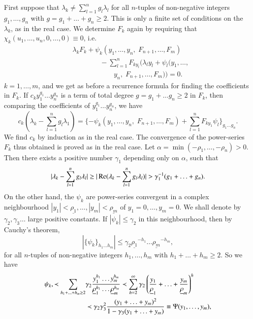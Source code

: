 First suppose that $\lambda_k \neq \sum\limits^n_{l=1} g_l\lambda_l$
for all $n$-tuples of non-negative integers $g_1, \ldots, g_n$ with $g
=g_1 + \ldots + g_n \geq 2$. This is only a finite set of conditions
on the $\lambda_k$, as in the real case. We determine $F_k$ again by
requiring that $\chi_k(u_1, \ldots, u_n, 0, \ldots, 0) \equiv 0$,
i.e. 
\begin{align*}
&\lambda_k F_k + \psi_k (y_1, \ldots, y_n, \; F_{n+1}, \ldots, F_m)\\ 
&\qquad\qquad -\sum\limits^n_{l=1} F_{ky_l} (\lambda_l y_l + \psi_l (y_1, \ldots,\\
&\qquad\qquad\qquad y_n, \; F_{n+1}, \ldots, F_m)) =0 . 
\tag*{$(\ast\ast)$}
\end{align*}
$k=1, \ldots, m$, and we get as before a recurrence formula for
finding the coefficients in $F_k$. If $c_k y^{g_1}_1 \ldots
y^{g_n}_n$ is a term of total degree $g = g_1 + \ldots g_n \geq 2 $ in
$F_k$, then comparing the coefficients of $y^{g_1}_1 \ldots
y^{g_n}_n$, we have  
$$
c_k \left(\lambda_k - \sum\limits^n_{l=1} g_l \lambda_1 \right) =
\{-\psi_k(y_1, \ldots, y_n,\; F_{n+1}, \ldots, F_m)  +
\sum\limits^n_{l=1} F_{ky_1} \psi_l\} _{g_1 \ldots g_n}.  
$$\pageoriginale
We find $c_k$ by induction as in the real case. The convergence of the
power-series $F_k$ thus obtained is proved as in the real case. Let
$\alpha = \min (-\rho_1, \ldots, -\rho_n) > 0$. Then there exists a
positive number $\gamma_1$ depending only on $\alpha$, such that  
$$
|\lambda_k - \sum\limits^n_{l=1} g_l \lambda_l| \geq |\operatorname{Re} (\lambda_k -
\sum\limits^n_{l=1} g_l \lambda_l) | > \gamma^{-1}_1 (g_1 + \ldots +
g_n).  
$$
On the other hand, the $\psi_k$ are power-series convergent in a
complex neighbourhood $|y_1| < \underline{\rho_1}, \ldots, |y_m|
<\underline{\rho_m}$ of $y_1 = 0, \ldots, y_m = 0$. We shall denote by
$\gamma_2, \gamma_3 \ldots$ large positive constants. If $|\psi_k|
\leq \gamma_2$ in this neighbourhood, then by Cauchy's theorem, 
$$
|\{\psi_k\}_{h_1 \ldots h_m}| \leq \gamma_2 \underline{\rho_1}^{-h_1}
\ldots  \underline{\rho_m}^{-h_m}, 
$$
for all $n$-tuples of non-negative integers $h_1, \ldots, h_m$ with
$h_1 + \ldots + h_m \geq 2$. So we have 
\begin{align*}
\psi_k, \prec \sum\limits_{h_1 + \ldots + h_m \geq 2} & \gamma_2
\frac{y^{h_1}_1 \ldots y^{h_m}_m}{\underline{\rho}^{h_1}_1 \ldots
  \underline{\rho}^{h_m}_m} \prec \sum\limits^\infty_{h=2} \gamma_2
\left(\frac{y_1}{\underline{\rho}_1} + \ldots + \frac{y_m}{\underline{\rho}_m}
\right)^h\\ 
& \prec \gamma_2 \gamma^2_3 \frac{ (y_1 + \ldots +
  y_m)^2}{1-\gamma_3(y_1+ \ldots + y_m)} \equiv \Psi (y_1, \ldots,
y_m),  
\end{align*}
